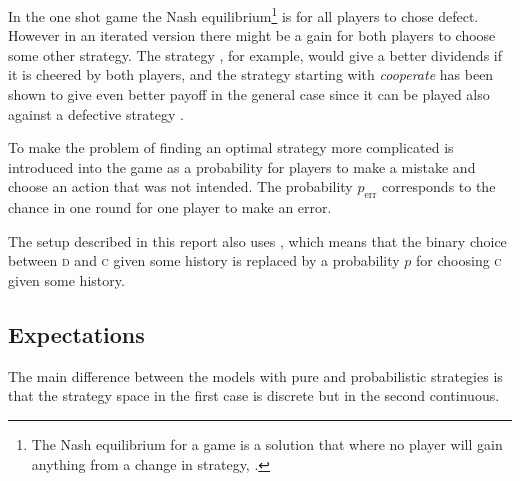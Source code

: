 In the one shot game the Nash equilibrium\footnote{The Nash equilibrium for a game is a solution that where no player will gain anything from a change in strategy, \cite{nash:1950}.} is for all players to chose defect. However in an iterated version there might be a gain for both players to choose some other strategy. The strategy , for example, would give a better dividends if it is cheered by both players, and the strategy  starting with \textit{cooperate} has been shown to give even better payoff in the general case since it can be played also against a defective strategy \cite{axelrod:1984}.\mypar

To make the problem of finding an optimal strategy more complicated  is introduced into the game as a probability for players to make a mistake and choose an action that was not intended. The probability $p_{\mathrm{err}}$ corresponds to the chance in one round for one player to make an error. %
\mypar

The setup described in this report also uses , which means that the binary choice between \textsc{d} and \textsc{c} given some history is replaced by a probability $p$ for choosing \textsc{c} given some history. %

\subsection{Expectations}
The main difference between the models with pure and probabilistic strategies is that the strategy space in the first case is discrete but in the second continuous.

